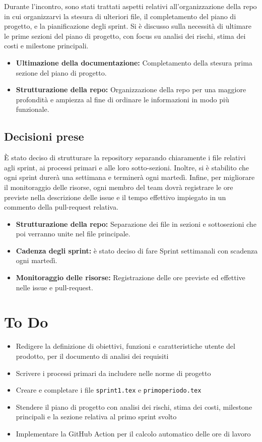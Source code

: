 \documentclass[a4paper, 12pt]{article}
\begin{document}
Durante l'incontro, sono stati trattati aspetti relativi all'organizzazione della repo in cui organizzarvi la stesura di ulteriori file, il completamento del piano di progetto, e la pianificazione degli sprint. 
Si è discusso sulla necessità di ultimare le prime sezioni del piano di progetto, con focus su analisi dei rischi, stima dei costi e milestone principali.

\begin{itemize}
    \item \textbf{Ultimazione della documentazione:} Completamento della stesura prima sezione del piano di progetto.
    \item \textbf{Strutturazione della repo:} Organizzazione della repo per una maggiore profondità e ampiezza al fine di ordinare le informazioni in modo più funzionale.
\end{itemize}

\subsection{Decisioni prese}

È stato deciso di strutturare la repository separando chiaramente i file relativi agli sprint, ai processi primari e alle loro sotto-sezioni. 
Inoltre, si è stabilito che ogni sprint durerà una settimana e terminerà ogni martedì. Infine, per migliorare il monitoraggio delle risorse, ogni membro del team dovrà registrare le ore previste nella descrizione delle issue e il tempo effettivo impiegato in un commento della pull-request relativa.

\begin{itemize}
    \item \textbf{Strutturazione della repo:} Separazione dei file in sezioni e sottosezioni che poi verranno unite nel file principale.
    \item \textbf{Cadenza degli sprint:} è stato deciso di fare Sprint settimanali con scadenza ogni martedì.
    \item \textbf{Monitoraggio delle risorse:} Registrazione delle ore previste ed effettive nelle issue e pull-request.
\end{itemize}

\section{To Do}
\begin{itemize}
    \item Redigere la definizione di obiettivi, funzioni e caratteristiche utente del prodotto, per il documento di analisi dei requisiti
    \item Scrivere i processi primari da includere nelle norme di progetto
    \item Creare e completare i file \texttt{sprint1.tex} e \texttt{primoperiodo.tex}
    \item Stendere il piano di progetto con analisi dei rischi, stima dei costi, milestone principali e la sezione relativa al primo sprint svolto
    \item Implementare la GitHub Action per il calcolo automatico delle ore di lavoro
\end{itemize}
\end{document}
